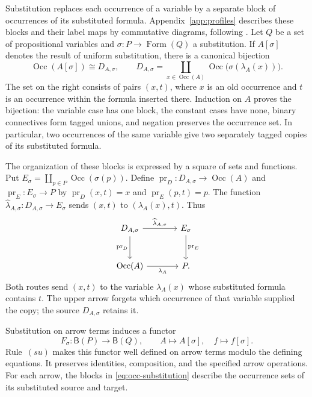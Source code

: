 \documentclass[11pt]{article}
\newcommand{\B}{\mathsf B}
\newcommand{\Occ}{\operatorname{Occ}}
\newcommand{\FormulaSet}{\operatorname{Form}}
\begin{document}
Substitution replaces each occurrence of a variable by a separate
block of occurrences of its substituted formula.
Appendix~\ref{app:profiles} describes these blocks and their label maps
by commutative diagrams, following \cite[\S9]{Notation}.
Let $Q$ be a set of propositional variables and
$\sigma:P\to\FormulaSet(Q)$ a substitution. If $A[\sigma]$ denotes the
result of uniform substitution, there is a canonical bijection
\begin{equation}
 \Occ(A[\sigma])\cong D_{A,\sigma},\qquad
 D_{A,\sigma}=\coprod_{x\in\Occ(A)}
                  \Occ\bigl(\sigma(\lambda_A(x))\bigr).
 \label{eq:occ-substitution}
\end{equation}
The set on the right consists of pairs $(x,t)$, where $x$ is an old
occurrence and $t$ is an occurrence within the formula inserted there.
Induction on $A$ proves the bijection: the variable case has one
block, the constant cases have none, binary connectives form tagged
unions, and negation preserves the occurrence set. In particular,
two occurrences of the same variable give two separately tagged
copies of its substituted formula.

The organization of these blocks is expressed by a square of sets and
functions. Put $E_\sigma=\coprod_{p\in P}\Occ(\sigma(p))$.
Define $\operatorname{pr}_D:D_{A,\sigma}\to\Occ(A)$ and
$\operatorname{pr}_E:E_\sigma\to P$ by
$\operatorname{pr}_D(x,t)=x$ and $\operatorname{pr}_E(p,t)=p$.
The function
$\widehat\lambda_{A,\sigma}:D_{A,\sigma}\to E_\sigma$ sends
$(x,t)$ to $(\lambda_A(x),t)$. Thus
\begin{equation}
\begin{tikzcd}[column sep=large,row sep=large]
 D_{A,\sigma}\arrow[r,"\widehat\lambda_{A,\sigma}"]
   \arrow[d,"\operatorname{pr}_D"']
   &E_\sigma\arrow[d,"\operatorname{pr}_E"]\\
 \Occ(A)\arrow[r,"\lambda_A"']&P.
\end{tikzcd}
\label{eq:block-square}
\end{equation}
Both routes send $(x,t)$ to the variable $\lambda_A(x)$ whose
substituted formula contains $t$. The upper arrow forgets which
occurrence of that variable supplied the copy; the source $D_{A,\sigma}$
retains it.

Substitution on arrow terms induces a functor
\[
 F_\sigma:\B(P)\longrightarrow\B(Q),\qquad
 A\longmapsto A[\sigma],\quad f\longmapsto f[\sigma].
\]
Rule~$(su)$ makes this functor well defined on arrow terms modulo the
defining equations. It preserves identities, composition, and the
specified arrow operations. For each arrow, the blocks in
\eqref{eq:occ-substitution} describe the occurrence sets of its
substituted source and target.
\end{document}
